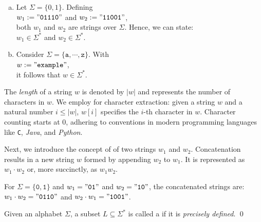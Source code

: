 \examplesEng
\begin{enumerate}[(a)]
\item Let \( \Sigma = \{0, 1\} \). Defining
      \\[0.2cm]
      \hspace*{1.3cm}
      \( w_1 := \mathtt{"01110"} \) and \( w_2 := \mathtt{"11001"} \),
      \\[0.2cm]
      both \( w_1 \) and \( w_2 \) are strings over \( \Sigma \). Hence, we can state:
      \\[0.2cm]
      \hspace*{1.3cm}
      \( w_1 \in \Sigma^* \) and \( w_2 \in \Sigma^* \).
\item Consider \( \Sigma = \{\mathtt{a}, \cdots, \mathtt{z}\} \). With
      \\[0.2cm]
      \hspace*{1.3cm}
      \( w := \mathtt{"example"} \),
      \\[0.2cm]
      it follows that \( w \in \Sigma^* \). \eox
\end{enumerate}

The \emph{length} of a string \( w \) is denoted by \( |w| \) and represents the number of characters in \( w
\).  
We employ  for character extraction: given a string \( w \) and a natural number
\( i \leq |w| \), \( w[i] \) specifies the \( i \)-th character in \( w \). Character counting starts at 0, adhering to
conventions in modern programming languages like \texttt{C}, \textsl{Java}, and \textsl{Python}. 

Next, we introduce the concept of   of two strings \( w_1 \) and
\(w_2 \). Concatenation results in a new string \( w \) formed by appending \( w_2 \) to \( w_1 \). It is
represented as \( w_1 \cdot w_2 \) or, more succinctly, as \( w_1w_2 \). 

\vspace*{0.3cm}

\exampleEng
For \( \Sigma = \{\mathtt{0}, \mathtt{1}\} \) and \( w_1 = \mathtt{"01"} \) and \( w_2 = \mathtt{"10"} \), the concatenated strings are:
\\[0.2cm]
\hspace*{1.3cm}
\( w_1 \cdot w_2 = \mathtt{"0110"} \) and \( w_2 \cdot w_1 = \mathtt{"1001"} \). \eox

\begin{Definition} \hspace*{\fill} \linebreak
Given an alphabet \( \Sigma \), a subset \( L \subseteq \Sigma^* \) is called a  if it is \emph{precisely defined}.  \qed
\end{Definition}

